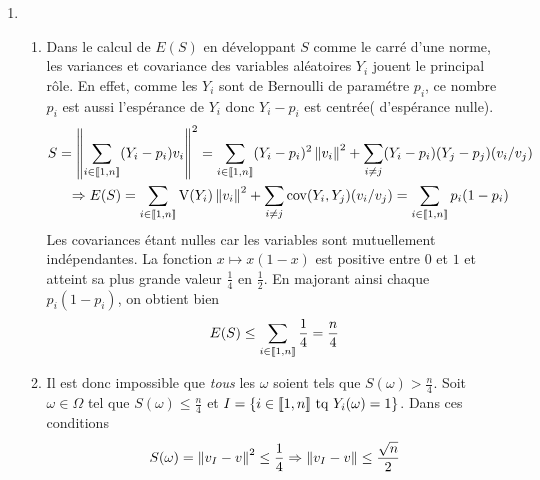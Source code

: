 \begin{enumerate}
  \item
\begin{enumerate}
  \item Dans le calcul de $E(S)$ en développant $S$ comme le carré d'une norme, les variances et covariance des variables aléatoires $Y_i$ jouent le principal rôle. En effet, comme les $Y_i$ sont de Bernoulli de paramétre $p_i$, ce nombre $p_i$ est aussi l'espérance de $Y_i$ donc $Y_i - p_i$ est centrée( d'espérance nulle).
\begin{multline*}
S =   \left\Vert\sum_{i\in \llbracket 1,n\rrbracket}(Y_i - p_i)v_i\right\Vert^2
= \sum_{i\in \llbracket 1,n\rrbracket}(Y_i - p_i)^2\left\Vert v_i\right\Vert^2 + \sum_{i\neq j}(Y_i-p_i)(Y_j-p_j)(v_i/v_j) \\
\Rightarrow
E(S) = 
\sum_{i\in \llbracket 1,n\rrbracket}\operatorname{V}(Y_i)\left\Vert v_i\right\Vert^2 + \sum_{i\neq j}\operatorname{cov}(Y_i,Y_j)(v_i/v_j)
= \sum_{i\in \llbracket 1,n\rrbracket}p_i(1-p_i)
\end{multline*}
Les covariances étant nulles car les variables sont mutuellement indépendantes. La fonction $x\mapsto x(1-x)$ est positive entre $0$ et $1$ et atteint sa plus grande valeur $\frac{1}{4}$ en $\frac{1}{2}$. En majorant ainsi chaque $p_i(1-p_i)$, on obtient bien
\begin{displaymath}
  E(S) \leq \sum_{i\in \llbracket 1,n\rrbracket}\frac{1}{4} = \frac{n}{4}
\end{displaymath}

  \item Il est donc impossible que \emph{tous} les $\omega$ soient tels que $S(\omega)>\frac{n}{4}$. Soit $\omega\in \Omega$ tel que $S(\omega)\leq \frac{n}{4}$ et $I=\left\{i\in \llbracket 1,n\rrbracket \text{ tq } Y_i(\omega)=1\right\}$. Dans ces conditions
\begin{displaymath}
  S(\omega)=\left\Vert v_I - v\right\Vert^2\leq \frac{1}{4} \Rightarrow \left\Vert v_I - v\right\Vert\leq \frac{\sqrt{n}}{2}
\end{displaymath}

\end{enumerate}

\end{enumerate}
